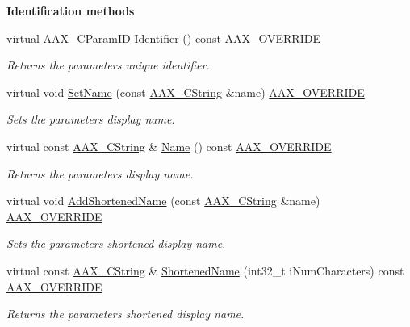 \begin{Indent}{\bf Identification methods}\par
\begin{DoxyCompactItemize}
\item 
virtual \hyperlink{a00149_a1440c756fe5cb158b78193b2fc1780d1}{A\+A\+X\+\_\+\+C\+Param\+I\+D} \hyperlink{a00033_aedf516885af595cae5d07dee050d9792}{Identifier} () const \hyperlink{a00149_ac2f24a5172689ae684344abdcce55463}{A\+A\+X\+\_\+\+O\+V\+E\+R\+R\+I\+D\+E}
\begin{DoxyCompactList}\small\item\em Returns the parameter\textquotesingle{}s unique identifier. \end{DoxyCompactList}\item 
virtual void \hyperlink{a00033_a95ccc6ef9aff70e029c55caf2c2bd432}{Set\+Name} (const \hyperlink{a00042}{A\+A\+X\+\_\+\+C\+String} \&name) \hyperlink{a00149_ac2f24a5172689ae684344abdcce55463}{A\+A\+X\+\_\+\+O\+V\+E\+R\+R\+I\+D\+E}
\begin{DoxyCompactList}\small\item\em Sets the parameter\textquotesingle{}s display name. \end{DoxyCompactList}\item 
virtual const \hyperlink{a00042}{A\+A\+X\+\_\+\+C\+String} \& \hyperlink{a00033_a0ca723751549cff4168198f8480b28e9}{Name} () const \hyperlink{a00149_ac2f24a5172689ae684344abdcce55463}{A\+A\+X\+\_\+\+O\+V\+E\+R\+R\+I\+D\+E}
\begin{DoxyCompactList}\small\item\em Returns the parameter\textquotesingle{}s display name. \end{DoxyCompactList}\item 
virtual void \hyperlink{a00033_aa4f22a15a2e73048b602e7f81db37cb4}{Add\+Shortened\+Name} (const \hyperlink{a00042}{A\+A\+X\+\_\+\+C\+String} \&name) \hyperlink{a00149_ac2f24a5172689ae684344abdcce55463}{A\+A\+X\+\_\+\+O\+V\+E\+R\+R\+I\+D\+E}
\begin{DoxyCompactList}\small\item\em Sets the parameter\textquotesingle{}s shortened display name. \end{DoxyCompactList}\item 
virtual const \hyperlink{a00042}{A\+A\+X\+\_\+\+C\+String} \& \hyperlink{a00033_a3a804fb1ba33f9b748294bc868915813}{Shortened\+Name} (int32\+\_\+t i\+Num\+Characters) const \hyperlink{a00149_ac2f24a5172689ae684344abdcce55463}{A\+A\+X\+\_\+\+O\+V\+E\+R\+R\+I\+D\+E}
\begin{DoxyCompactList}\small\item\em Returns the parameter\textquotesingle{}s shortened display name. \end{DoxyCompactList}\item 

\end{DoxyCompactItemize}
\end{Indent}
